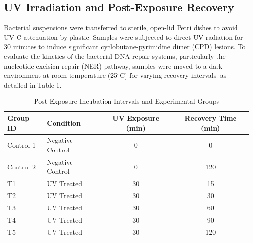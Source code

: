 \documentclass[a4paper]{article}
\begin{document}
\subsection{UV Irradiation and Post-Exposure Recovery}
Bacterial suspensions were transferred to sterile, open-lid Petri dishes to avoid UV-C attenuation by plastic. Samples were subjected to direct UV radiation for 30 minutes to induce significant cyclobutane-pyrimidine dimer (CPD) lesions. To evaluate the kinetics of the bacterial DNA repair systems, particularly the nucleotide excision repair (NER) pathway, samples were moved to a dark environment at room temperature (25$^\circ$C) for varying recovery intervals, as detailed in Table 1.

\begin{table}[h!]
\centering
\caption{Post-Exposure Incubation Intervals and Experimental Groups}
\label{tab:uv_intervals}
\begin{tabular}{@{}llcc@{}}
\toprule
\textbf{Group ID} & \textbf{Condition} & \textbf{UV Exposure (min)} & \textbf{Recovery Time (min)} \\ \midrule
Control 1         & Negative Control   & 0                          & 0                            \\
Control 2         & Negative Control   & 0                          & 120                          \\
T1                & UV Treated         & 30                         & 15                           \\
T2                & UV Treated         & 30                         & 30                           \\
T3                & UV Treated         & 30                         & 60                           \\
T4                & UV Treated         & 30                         & 90                           \\
T5                & UV Treated         & 30                         & 120                          \\ \bottomrule
\end{tabular}
\end{table}
\end{document}
